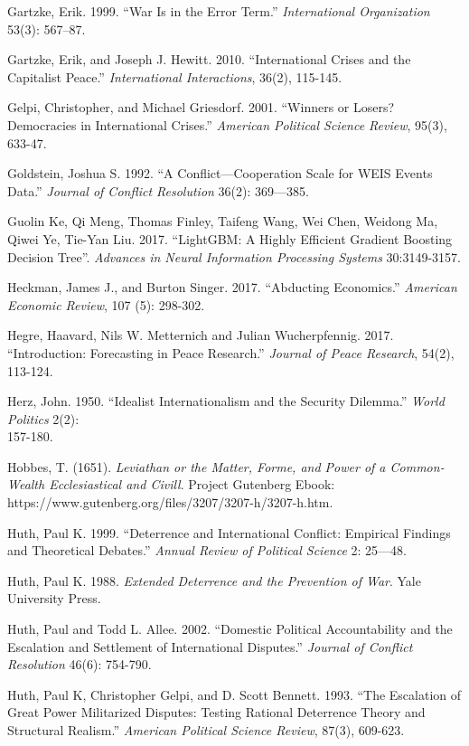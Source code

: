 \documentclass[
  letterpaper,
  DIV=11,
  numbers=noendperiod]{scrartcl}
\begin{document}
Gartzke, Erik. 1999. ``War Is in the Error Term.'' \emph{International
Organization} 53(3): 567--87.

Gartzke, Erik, and Joseph J. Hewitt. 2010. ``International Crises and
the Capitalist Peace.'' \emph{International Interactions}, 36(2),
115-145.

Gelpi, Christopher, and Michael Griesdorf. 2001. ``Winners or Losers?
Democracies in International Crises.'' \emph{American Political Science
Review}, 95(3), 633-47.

Goldstein, Joshua S. 1992. ``A Conflict---Cooperation Scale for WEIS
Events Data.'' \emph{Journal of Conflict Resolution} 36(2): 369---385.

Guolin Ke, Qi Meng, Thomas Finley, Taifeng Wang, Wei Chen, Weidong Ma,
Qiwei Ye, Tie-Yan Liu. 2017. ``LightGBM: A Highly Efficient Gradient
Boosting Decision Tree''. \emph{Advances in Neural Information
Processing Systems} 30:3149-3157.

Heckman, James J., and Burton Singer. 2017. ``Abducting Economics.''
\emph{American Economic Review}, 107 (5): 298-302.

Hegre, Haavard, Nils W. Metternich and Julian Wucherpfennig. 2017.
``Introduction: Forecasting in Peace Research.'' \emph{Journal of Peace
Research}, 54(2), 113-124.

Herz, John. 1950. ``Idealist Internationalism and the Security
Dilemma.'' \emph{World Politics} 2(2):\\
157-180.

Hobbes, T. (1651). \emph{Leviathan or the Matter, Forme, and Power of a
Common-Wealth Ecclesiastical and Civill}. Project Gutenberg Ebook:~
https://www.gutenberg.org/files/3207/3207-h/3207-h.htm.

Huth, Paul K. 1999. ``Deterrence and International Conflict: Empirical
Findings and Theoretical Debates.'' \emph{Annual Review of Political
Science} 2: 25---48.~

Huth, Paul K. 1988. \emph{Extended Deterrence and the Prevention of
War}. Yale University Press.

Huth, Paul and Todd L. Allee. 2002. ``Domestic Political Accountability
and the Escalation and Settlement of International Disputes.''
\emph{Journal of Conflict Resolution} 46(6): 754-790.

Huth, Paul K, Christopher Gelpi, and D. Scott Bennett. 1993. ``The
Escalation of Great Power Militarized Disputes: Testing Rational
Deterrence Theory and Structural Realism.'' \emph{American Political
Science Review}, 87(3), 609-623.
\end{document}

